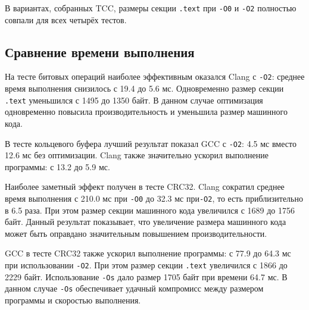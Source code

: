 \documentclass[12pt,a4paper]{article}
\begin{document}
В вариантах, собранных TCC, размеры секции \texttt{.text} при \texttt{-O0} и \texttt{-O2} полностью совпали для всех четырёх тестов.

\subsection{Сравнение времени выполнения}

\begin{table}[h]
\centering
\caption{Среднее время выполнения сценарных тестов, мс}
\end{table}

На тесте битовых операций наиболее эффективным оказался Clang с \texttt{-O2}: среднее время выполнения снизилось с 19.4 до 5.6 мс. Одновременно размер секции \texttt{.text} уменьшился с 1495 до 1350 байт. В данном случае оптимизация одновременно повысила производительность и уменьшила размер машинного кода.

В тесте кольцевого буфера лучший результат показал GCC с \texttt{-O2}: 4.5 мс вместо 12.6 мс без оптимизации. Clang также значительно ускорил выполнение программы: с 13.2 до 5.9 мс.

Наиболее заметный эффект получен в тесте CRC32. Clang сократил среднее время выполнения с 210.0 мс при \texttt{-O0} до 32.3 мс при\texttt{-O2}, то есть приблизительно в 6.5 раза. При этом размер секции машинного кода увеличился с 1689 до 1756 байт. Данный результат показывает, что увеличение размера машинного кода может быть оправдано значительным повышением производительности.

GCC в тесте CRC32 также ускорил выполнение программы: с 77.9 до 64.3 мс при использовании \texttt{-O2}. При этом размер секции \texttt{.text} увеличился с 1866 до 2229 байт. Использование \texttt{-Os} дало размер 1705 байт при времени 64.7 мс. В данном случае \texttt{-Os} обеспечивает удачный компромисс между размером программы и скоростью выполнения.
\end{document}
